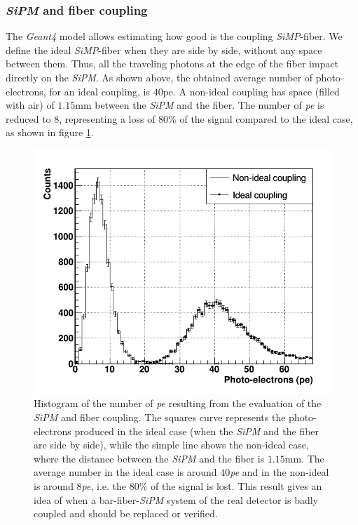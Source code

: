 \documentclass[submitting]{nst}
\begin{document}
\subsubsection{ \textsl{SiPM} and fiber coupling}%
The \textsl{Geant4} model allows estimating how good is the coupling \textsl{SiMP}-fiber. We define the ideal \textsl{SiMP}-fiber when they are side by side, without any space between them. Thus, all the traveling photons at the edge of the fiber impact directly on the \textsl{SiPM}. As shown above, the obtained average number of photo-electrons, for an ideal coupling, is $40$pe. A non-ideal coupling has space (filled with air) of $1.15$mm between the \textsl{SiPM} and the fiber. The number of \textsl{pe} is reduced to $8$, representing a loss of 80\% of the signal compared to the ideal case, as shown in figure \ref{coupling}.
\begin{figure}
    \centering
    \includegraphics[scale=0.41]{Figures/coupling.png}
    \caption{Histogram of the number of \textsl{pe} resulting from the evaluation of the \textsl{SiPM} and fiber coupling. The squares curve represents the photo-electrons produced in the ideal case (when the \textsl{SiPM} and the fiber are side by side), while the simple line shows the non-ideal case, where the distance between the \textsl{SiPM} and the fiber is $1.15$mm. The average number  in the ideal case is around $40$\textsl{pe} and in the non-ideal is around $8$\textsl{pe}, i.e. the $80$\% of the signal is lost. This result gives an idea of when a bar-fiber-\textsl{SiPM} system of the real detector is badly coupled and should be replaced or verified.}
    \label{coupling}
\end{figure}
\end{document}
